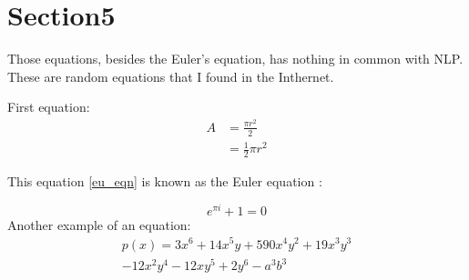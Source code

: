 \documentclass{article}
\begin{document}
\newpage \section{Section5}
Those equations, besides the Euler's equation, has nothing in common with NLP. These are random equations that I found in the Inthernet. 

First equation:\begin{equation} \label{eq1}
\begin{split}
A & = \frac{\pi r^2}{2} \\
& = \frac{1}{2} \pi r^2
\end{split}
\end{equation}\newline

This equation \ref{eu_eqn} is known as the Euler equation :\par \begin{equation} \label{eu_eqn}
e^{\pi i} + 1 = 0
\end{equation}
Another example of an equation: \begin{multline*}
p(x) = 3x^6 + 14x^5y + 590x^4y^2 + 19x^3y^3\\ 
- 12x^2y^4 - 12xy^5 + 2y^6 - a^3b^3
\end{multline*}\newline
\end{document}
